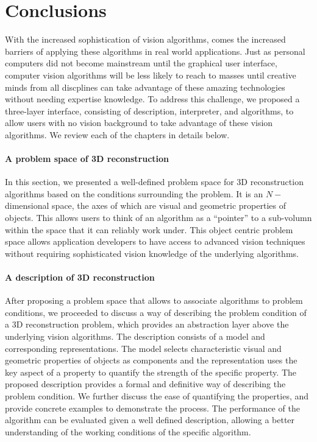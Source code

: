 
\chapter{Conclusions}
\label{ch:conclusion}
With the increased sophistication of vision algorithms, comes the increased barriers of applying these algorithms in real world applications. Just as personal computers did not become mainstream until the graphical user interface, computer vision algorithms will be less likely to reach to masses until creative minds from all discplines can take advantage of these amazing technologies without needing expertise knowledge. To address this challenge, we proposed a three-layer interface, consisting of description, interpreter, and algorithms, to allow users with no vision background to take advantage of these vision algorithms. We review each of the chapters in details below.

\subsubsection{A problem space of 3D reconstruction}
In this section, we presented a well-defined problem space for 3D reconstruction algorithms based on the conditions surrounding the problem. It is an $N-$dimensional space, the axes of which are visual and geometric properties of objects. This allows users to think of an algorithm as a ``pointer'' to a sub-volumn within the space that it can reliably work under. This object centric problem space allows application developers to have access to advanced vision techniques without requiring sophisticated vision knowledge of the underlying algorithms.

\subsubsection{A description of 3D reconstruction}
After proposing a problem space that allows to associate algorithms to problem conditions, we proceeded to discuss a way of describing the problem condition of a 3D reconstruction problem, which provides an abstraction layer above the underlying vision algorithms. The description consists of a model and corresponding representations. The model selects characteristic visual and geometric properties of objects as components and the representation uses the key aspect of a property to quantify the strength of the specific property. The proposed description provides a formal and definitive way of describing the problem condition. We further discuss the ease of quantifying the properties, and provide concrete examples to demonstrate the process. The performance of the algorithm can be evaluated given a well defined description, allowing a better understanding of the working conditions of the specific algorithm.

